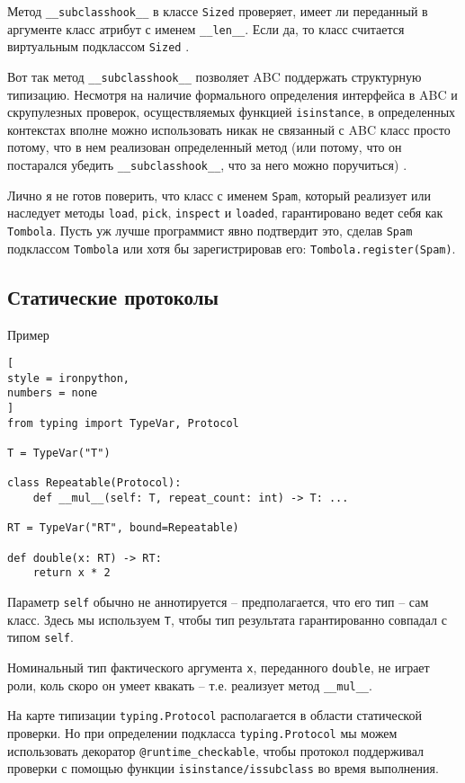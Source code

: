 \documentclass[%
	11pt,
	a4paper,
	utf8,
		]{article}
\begin{document}
Метод \verb*|__subclasshook__| в классе \verb*|Sized| проверяет, имеет ли переданный в аргументе класс атрибут с именем \verb*|__len__|. Если да, то класс считается виртуальным подклассом \verb*|Sized| \cite[]{ramalho:python-2022}.

Вот так метод \verb*|__subclasshook__| позволяет ABC поддержать структурную типизацию. Несмотря на наличие формального определения интерфейса в ABC и скрупулезных проверок, осуществляемых функцией \verb*|isinstance|, в определенных контекстах вполне можно использовать никак не связанный с ABC класс просто потому, что в нем реализован определенный метод (или потому, что он постарался убедить \verb*|__subclasshook__|, что за него можно поручиться) \cite[]{ramalho:python-2022}.

Лично я не готов поверить, что класс с именем \verb*|Spam|, который реализует или наследует методы \verb*|load|, \verb*|pick|, \verb*|inspect| и \verb*|loaded|, гарантировано ведет себя как \verb*|Tombola|. Пусть уж лучше программист явно подтвердит это, сделав \verb*|Spam| подклассом \verb*|Tombola| или хотя бы зарегистрировав его: \verb*|Tombola.register(Spam)|. 

\subsection{Статические протоколы}

Пример
\begin{lstlisting}[
style = ironpython,
numbers = none
]
from typing import TypeVar, Protocol

T = TypeVar("T")

class Repeatable(Protocol):
    def __mul__(self: T, repeat_count: int) -> T: ...

RT = TypeVar("RT", bound=Repeatable)

def double(x: RT) -> RT:
    return x * 2
\end{lstlisting}

Параметр \verb*|self| обычно не аннотируется -- предполагается, что его тип -- сам класс. Здесь мы используем \verb*|T|, чтобы тип результата гарантированно совпадал с типом \verb*|self|. 

Номинальный тип фактического аргумента \verb*|x|, переданного \verb*|double|, не играет роли, коль скоро он умеет квакать -- т.е. реализует метод \verb*|__mul__|.

На карте типизации \verb*|typing.Protocol| располагается в области статической проверки. Но при определении подкласса \verb*|typing.Protocol| мы можем использовать декоратор \verb*|@runtime_checkable|, чтобы протокол поддерживал проверки с помощью функции \verb*|isinstance/issubclass| во время выполнения.
\end{document}
